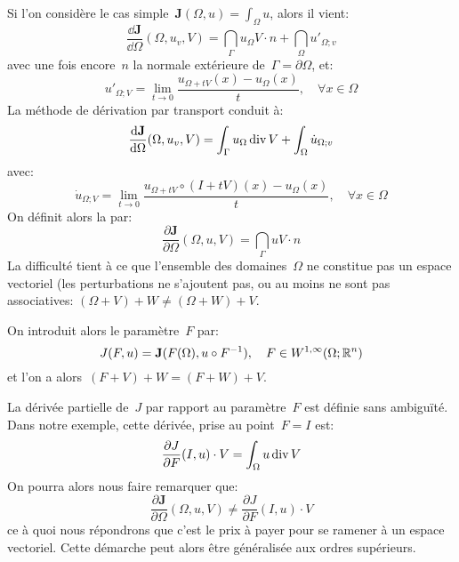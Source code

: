 \medskip
Si l'on considère le cas simple~${\mathbf J}(\Omega,u)=\int_\Omega u$, alors il vient:
\begin{equation}
\dfrac{\dd{\mathbf J}}{\dd\Omega}(\Omega, u_v,V)=\dint_\Gamma u_\Omega V\cdot n + \dint_\Omega u'_{\Omega;v}
\end{equation}
avec une fois encore~$n$ la normale extérieure de~$\Gamma=\partial\Omega$, et:
\begin{equation}
u'_{\Omega;V}=\lim_{t\rightarrow0} \dfrac{u_{\Omega+tV}(x)-u_\Omega(x)}t, \quad\forall x\in\Omega
\end{equation}
La méthode de dérivation par transport conduit à:
\begin{equation}
\dfrac{\text{d}{\mathbf J}}{\text{d}\Omega}(\Omega, u_v,V)=\displaystyle\int_\Gamma u_\Omega \operatorname{div} V + \displaystyle\int_\Omega \dot{u}_{\Omega;v}
\end{equation}
avec:
\begin{equation}
\dot{u}_{\Omega;V}=\lim_{t\rightarrow0} \dfrac{u_{\Omega+tV}\circ (I+tV)(x)-u_\Omega(x)}t,\quad \forall x\in\Omega
\end{equation}
On définit alors la 
par:
\begin{equation}
\dfrac{\partial{\mathbf J}}{\partial\Omega}(\Omega, u,V) = \dint_\Gamma u V\cdot n
\end{equation}
La difficulté tient à ce que l'ensemble des domaines~$\Omega$ ne constitue pas un espace vectoriel (les perturbations ne s'ajoutent pas, ou au moins ne sont pas associatives:
$(\Omega+V)+W\ne(\Omega+W)+V$.

\medskip
{} On introduit alors le paramètre~$F$ par:
\begin{equation}
J(F,u)={\mathbf J}(F(\Omega),u\circ F^{-1}),\quad F\in W^{1,\infty}(\Omega;\mathbb R^n)
\end{equation}
et l'on a alors~$(F+V)+W=(F+W)+V$.

La dérivée partielle de~$J$ par rapport au paramètre~$F$ est définie sans ambiguïté. Dans notre exemple, cette dérivée, prise au point~$F=I$ est:
\begin{equation}
\dfrac{\partial J}{\partial F}(I,u)\cdot V = \displaystyle\int_\Omega u \operatorname{div} V
\end{equation}
On pourra alors nous faire remarquer que:
\begin{equation}
\dfrac{\partial{\mathbf J}}{\partial\Omega}(\Omega, u,V)
\ne
\dfrac{\partial J}{\partial F}(I,u)\cdot V
\end{equation}
ce à quoi nous répondrons que c'est le prix à payer pour se ramener à un espace vectoriel. Cette démarche peut alors être généralisée aux ordres supérieurs.

